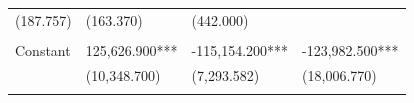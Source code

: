 \documentclass[]{book}
\begin{document}
\begin{longtable}[]{@{}llll@{}}
\begin{minipage}[t]{0.24\columnwidth}
(187.757)\strut
\end{minipage} & \begin{minipage}[t]{0.24\columnwidth}\raggedright\strut
(163.370)\strut
\end{minipage} & \begin{minipage}[t]{0.24\columnwidth}\raggedright\strut
(442.000)\strut
\end{minipage}\tabularnewline
\begin{minipage}[t]{0.17\columnwidth}\raggedright\strut
\strut
\end{minipage} & \begin{minipage}[t]{0.24\columnwidth}\raggedright\strut
\strut
\end{minipage} & \begin{minipage}[t]{0.24\columnwidth}\raggedright\strut
\strut
\end{minipage} & \begin{minipage}[t]{0.24\columnwidth}\raggedright\strut
\strut
\end{minipage}\tabularnewline
\begin{minipage}[t]{0.17\columnwidth}\raggedright\strut
Constant\strut
\end{minipage} & \begin{minipage}[t]{0.24\columnwidth}\raggedright\strut
125,626.900***\strut
\end{minipage} & \begin{minipage}[t]{0.24\columnwidth}\raggedright\strut
-115,154.200***\strut
\end{minipage} & \begin{minipage}[t]{0.24\columnwidth}\raggedright\strut
-123,982.500***\strut
\end{minipage}\tabularnewline
\begin{minipage}[t]{0.17\columnwidth}\raggedright\strut
\strut
\end{minipage} & \begin{minipage}[t]{0.24\columnwidth}\raggedright\strut
(10,348.700)\strut
\end{minipage} & \begin{minipage}[t]{0.24\columnwidth}\raggedright\strut
(7,293.582)\strut
\end{minipage} & \begin{minipage}[t]{0.24\columnwidth}\raggedright\strut
(18,006.770)\strut
\end{minipage}\tabularnewline
\begin{minipage}[t]{0.17\columnwidth}\raggedright\strut
\strut
\end{minipage} & \begin{minipage}[t]{0.24\columnwidth}\raggedright\strut

\end{minipage}
\end{longtable}
\end{document}
